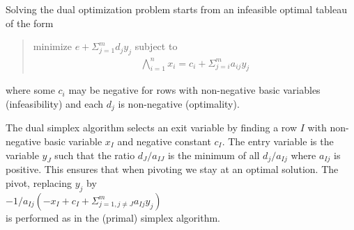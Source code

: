 \documentclass{uist96}
\begin{document}
Solving the dual optimization problem starts from
an infeasible optimal tableau of the form
\begin{quote}\vspace*{-1ex}
minimize $e + \Sigma_{j=1}^m d_j y_j$ subject to
$$\begin{array}{rcl}
\bigwedge_{i=1}^{n} x_i = c_i + \Sigma_{j=i}^m a_{ij} y_j
\end{array}$$
\end{quote}\vspace{-0.9ex}
where some $c_i$ may be negative 
for rows with non-negative basic variables (infeasibility) 
and each $d_j$ is non-negative (optimality).

The dual simplex algorithm selects an exit variable
by finding a row $I$ with non-negative basic variable
$x_I$ and negative constant $c_I$\@.  
The entry variable is the variable $y_J$
such that
the ratio $d_J/a_{IJ}$ is the minimum of all $d_j/a_{Ij}$
where $a_{Ij}$ is positive. This ensures that when pivoting we stay at an
optimal solution.
The pivot, replacing $y_j$ by \\
\hspace*{5mm} 
$-1/a_{Ij} (-x_I + c_I + \Sigma_{j=1, j\neq J }^m a_{Ij} y_j)$ \\
is performed as in the (primal) simplex algorithm.
\end{document}
